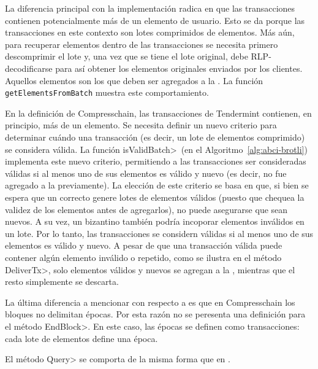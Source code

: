 La diferencia principal con la implementación \vanilla radica en que las transacciones contienen
potencialmente más de un elemento de usuario. Esto se da porque las transacciones en este contexto
son lotes comprimidos de elementos.
%
Más aún, para recuperar elementos dentro de las transacciones se necesita primero descomprimir
el lote y, una vez que se tiene el lote original, debe RLP-decodificarse para así obtener los elementos
originales enviados por los clientes.
%
Aquellos elementos son los que deben ser agregados a la \setchain. La función \texttt{getElementsFromBatch}
muestra este comportamiento.

En la definición de Compresschain, las transacciones de Tendermint contienen, en principio, más de un elemento.
%
Se necesita definir un nuevo criterio para determinar cuándo una transacción (es decir, un lote de elementos
comprimido) se considera válida.
%
La función \<isValidBatch>~(en el Algoritmo~\ref{alg:abci-brotli}) implementa este nuevo criterio, permitiendo
a las transacciones ser consideradas válidas si al menos uno de sus elementos es válido y nuevo (es decir,
no fue agregado a la \setchain previamente).
%
La elección de este criterio se basa en que, si bien se espera
que un \collector correcto genere lotes de elementos válidos (puesto que chequea la validez de los elementos
antes de agregarlos), no puede asegurarse que sean nuevos.
A su vez, un \collector bizantino también podría incoporar elementos inválidos en un lote.
%
Por lo tanto, las transacciones se considern válidas si al menos uno de sus elementos es válido y nuevo.
%
A pesar de que una transacción válida puede contener algún elemento inválido o repetido,
como se ilustra en el método \<DeliverTx>, solo elementos válidos y nuevos se agregan a la \setchain,
mientras que el resto simplemente se descarta.
%

La última diferencia a mencionar con respecto a \vanilla es que en Compresschain los bloques no delimitan épocas.
Por esta razón no se peresenta una definición para el método \<EndBlock>.
En este caso, las épocas se definen como transacciones: cada lote de elementos define una época.

%
El método \<Query> se comporta de la misma forma que en \vanilla.

